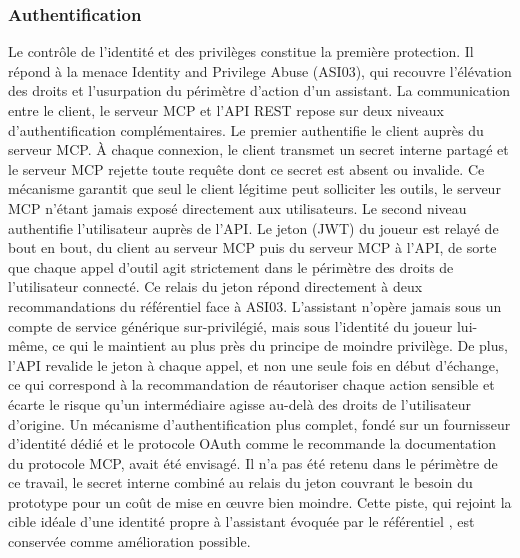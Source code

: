 \documentclass[12pt]{article}
\begin{document}
\subsubsection{Authentification}
Le contrôle de l'identité et des privilèges constitue la première protection. Il répond à la menace Identity and Privilege Abuse (ASI03), qui recouvre l'élévation des droits et l'usurpation du périmètre d'action d'un assistant. La communication entre le client, le serveur MCP et l'API REST repose sur deux niveaux d'authentification complémentaires. Le premier authentifie le client auprès du serveur MCP. À chaque connexion, le client transmet un secret interne partagé et le serveur MCP rejette toute requête dont ce secret est absent ou invalide. Ce mécanisme garantit que seul le client légitime peut solliciter les outils, le serveur MCP n'étant jamais exposé directement aux utilisateurs. Le second niveau authentifie l'utilisateur auprès de l'API. Le jeton (JWT) du joueur est relayé de bout en bout, du client au serveur MCP puis du serveur MCP à l'API, de sorte que chaque appel d'outil agit strictement dans le périmètre des droits de l'utilisateur connecté.
\newline\newline
Ce relais du jeton répond directement à deux recommandations du référentiel face à ASI03. L'assistant n'opère jamais sous un compte de service générique sur-privilégié, mais sous l'identité du joueur lui-même, ce qui le maintient au plus près du principe de moindre privilège. De plus, l'API revalide le jeton à chaque appel, et non une seule fois en début d'échange, ce qui correspond à la recommandation de réautoriser chaque action sensible \parencite[p~17]{owasp_owasp_2025} et écarte le risque qu'un intermédiaire agisse au-delà des droits de l'utilisateur d'origine.
\newline\newline
Un mécanisme d'authentification plus complet, fondé sur un fournisseur d'identité dédié et le protocole OAuth comme le recommande la documentation du protocole MCP, avait été envisagé. Il n'a pas été retenu dans le périmètre de ce travail, le secret interne combiné au relais du jeton couvrant le besoin du prototype pour un coût de mise en œuvre bien moindre. Cette piste, qui rejoint la cible idéale d'une identité propre à l'assistant évoquée par le référentiel \parencite[p~17]{owasp_owasp_2025}, est conservée comme amélioration possible.
\end{document}
